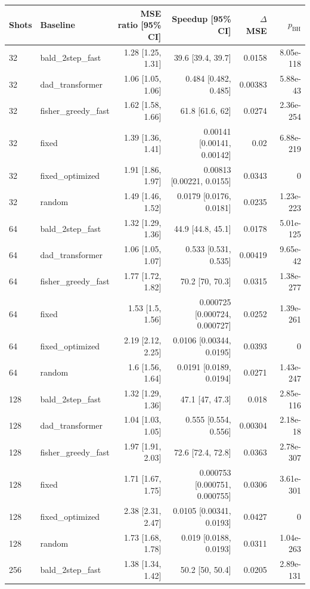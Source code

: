 \begin{tabular}{llrrrr}
\toprule
Shots & Baseline & MSE ratio [95\% CI] & Speedup [95\% CI] & $\Delta$MSE & $p_{\mathrm{BH}}$ \\
\midrule
32 & bald\_2step\_fast & 1.28 [1.25, 1.31] & 39.6 [39.4, 39.7] & 0.0158 & 8.05e-118 \\
32 & dad\_transformer & 1.06 [1.05, 1.06] & 0.484 [0.482, 0.485] & 0.00383 & 5.88e-43 \\
32 & fisher\_greedy\_fast & 1.62 [1.58, 1.66] & 61.8 [61.6, 62] & 0.0274 & 2.36e-254 \\
32 & fixed & 1.39 [1.36, 1.41] & 0.00141 [0.00141, 0.00142] & 0.02 & 6.88e-219 \\
32 & fixed\_optimized & 1.91 [1.86, 1.97] & 0.00813 [0.00221, 0.0155] & 0.0343 & 0 \\
32 & random & 1.49 [1.46, 1.52] & 0.0179 [0.0176, 0.0181] & 0.0235 & 1.23e-223 \\
64 & bald\_2step\_fast & 1.32 [1.29, 1.36] & 44.9 [44.8, 45.1] & 0.0178 & 5.01e-125 \\
64 & dad\_transformer & 1.06 [1.05, 1.07] & 0.533 [0.531, 0.535] & 0.00419 & 9.65e-42 \\
64 & fisher\_greedy\_fast & 1.77 [1.72, 1.82] & 70.2 [70, 70.3] & 0.0315 & 1.38e-277 \\
64 & fixed & 1.53 [1.5, 1.56] & 0.000725 [0.000724, 0.000727] & 0.0252 & 1.39e-261 \\
64 & fixed\_optimized & 2.19 [2.12, 2.25] & 0.0106 [0.00344, 0.0195] & 0.0393 & 0 \\
64 & random & 1.6 [1.56, 1.64] & 0.0191 [0.0189, 0.0194] & 0.0271 & 1.43e-247 \\
128 & bald\_2step\_fast & 1.32 [1.29, 1.36] & 47.1 [47, 47.3] & 0.018 & 2.85e-116 \\
128 & dad\_transformer & 1.04 [1.03, 1.05] & 0.555 [0.554, 0.556] & 0.00304 & 2.18e-18 \\
128 & fisher\_greedy\_fast & 1.97 [1.91, 2.03] & 72.6 [72.4, 72.8] & 0.0363 & 2.78e-307 \\
128 & fixed & 1.71 [1.67, 1.75] & 0.000753 [0.000751, 0.000755] & 0.0306 & 3.61e-301 \\
128 & fixed\_optimized & 2.38 [2.31, 2.47] & 0.0105 [0.00341, 0.0193] & 0.0427 & 0 \\
128 & random & 1.73 [1.68, 1.78] & 0.019 [0.0188, 0.0193] & 0.0311 & 1.04e-263 \\
256 & bald\_2step\_fast & 1.38 [1.34, 1.42] & 50.2 [50, 50.4] & 0.0205 & 2.89e-131 \\

\end{tabular}
